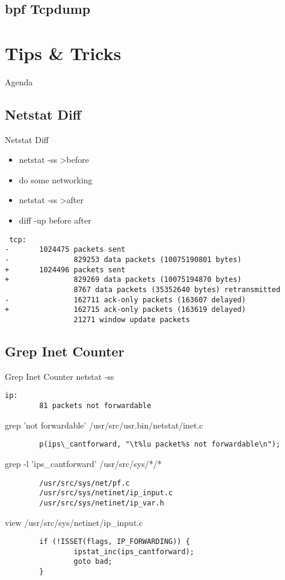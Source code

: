 \documentclass[14pt]{beamer}
\begin{document}
\subsection{bpf Tcpdump}

\section{Tips \& Tricks}
\begin{frame}{Agenda}
\tableofcontents[currentsection]
\end{frame}

\subsection{Netstat Diff}
\begin{frame}[fragile]{Netstat Diff}
\begin{itemize}
  \item netstat -ss >before
  \item do some networking
  \item netstat -ss >after
  \item diff -up before after
\end{itemize}
\scriptsize
\begin{verbatim}
 tcp:
-       1024475 packets sent
-               829253 data packets (10075190801 bytes)
+       1024496 packets sent
+               829269 data packets (10075194870 bytes)
                8767 data packets (35352640 bytes) retransmitted
-               162711 ack-only packets (163607 delayed)
+               162715 ack-only packets (163619 delayed)
                21271 window update packets
\end{verbatim}
\end{frame}

\subsection{Grep Inet Counter}
\begin{frame}[fragile]{Grep Inet Counter}
\scriptsize
netstat -ss
\begin{verbatim}
ip:
        81 packets not forwardable
\end{verbatim}
grep 'not forwardable' /usr/src/usr.bin/netstat/inet.c
\begin{verbatim}
        p(ips\_cantforward, "\t%lu packet%s not forwardable\n");
\end{verbatim}
grep -l 'ips\_cantforward' /usr/src/sys/*/*
\begin{verbatim}
        /usr/src/sys/net/pf.c
        /usr/src/sys/netinet/ip_input.c
        /usr/src/sys/netinet/ip_var.h
\end{verbatim}
view /usr/src/sys/netinet/ip\_input.c
\begin{verbatim}
        if (!ISSET(flags, IP_FORWARDING)) {
                ipstat_inc(ips_cantforward);
                goto bad;
        }
\end{verbatim}
\end{frame}
\end{document}
